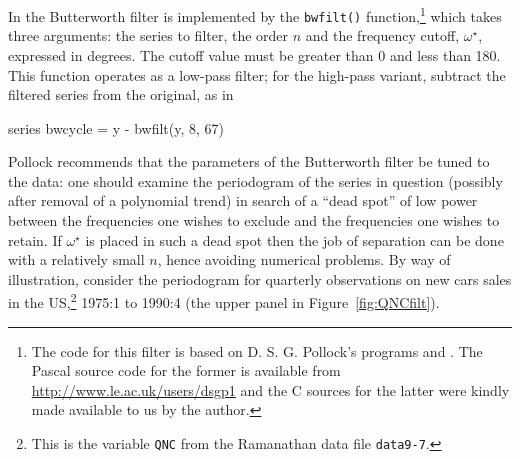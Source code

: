 In  the Butterworth filter is implemented by the
\verb+bwfilt()+ function,\footnote{The code for this filter is based
  on D. S. G. Pollock's programs  and . The
  Pascal source code for the former is available from
  \url{http://www.le.ac.uk/users/dsgp1} and the C sources for the
  latter were kindly made available to us by the author.} which takes
three arguments: the series to filter, the order $n$ and the frequency
cutoff, $\omega^{\star}$, expressed in degrees. The cutoff value must
be greater than 0 and less than 180. This function operates as a
low-pass filter; for the high-pass variant, subtract the filtered
series from the original, as in
%
\begin{code}
series bwcycle = y - bwfilt(y, 8, 67)
\end{code}

Pollock recommends that the parameters of the Butterworth filter be
tuned to the data: one should examine the periodogram of the series in
question (possibly after removal of a polynomial trend) in search of a
``dead spot'' of low power between the frequencies one wishes to
exclude and the frequencies one wishes to retain. If $\omega^{\star}$
is placed in such a dead spot then the job of separation can be done
with a relatively small $n$, hence avoiding numerical problems. By way
of illustration, consider the periodogram for quarterly observations
on new cars sales in the US,\footnote{This is the variable
  \texttt{QNC} from the Ramanathan data file \texttt{data9-7}.} 1975:1
to 1990:4 (the upper panel in Figure~\ref{fig:QNCfilt}).

